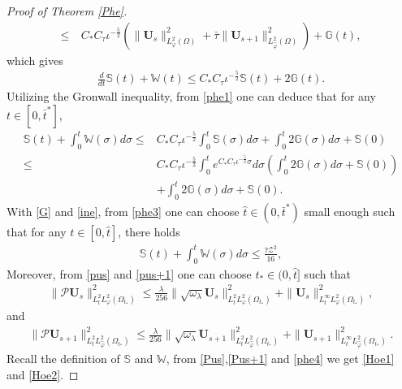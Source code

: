 \documentclass{amsart}
\numberwithin{equation}{section}
\begin{document}
\begin{proof}[Proof of Theorem \ref{Phe}]
\begin{align}
\leq&~C_{*}C_{\tau}\iota^{-\frac{5}{2}}
      \left(\|\mathbf{U}_{s}\|_{L_{\varphi}^{2}(\Omega)}^{2}+\bar{\tau}\|\mathbf{U}_{s+1}\|_{L_{\hat{\varphi}}^{2}(\Omega)}^{2}\right)
    +\mathbb{G}(t),\nonumber
\end{align}
which gives
\begin{align}\label{phe1}
\frac{d}{dt}\mathbb{S}(t)+\mathbb{W}(t)
\leq C_{*}C_{\tau}\iota^{-\frac{5}{2}}\mathbb{S}(t)+2\mathbb{G}(t).
\end{align}
Utilizing the Gronwall inequality, from \eqref{phe1} one can deduce that for any $t\in[0,\bar{t}^{*}]$,
\begin{align}\label{phe3}
\mathbb{S}(t)+\int_{0}^{t}\mathbb{W}(\sigma)d\sigma
\leq& C_{*}C_{\tau}\iota^{-\frac{5}{2}}\int_{0}^{t}\mathbb{S}(\sigma)d\sigma
     +\int_{0}^{t}2\mathbb{G}(\sigma)d\sigma
     +\mathbb{S}(0)\\
\leq& C_{*}C_{\tau}\iota^{-\frac{5}{2}}\int_{0}^{t}e^{C_{*}C_{\tau}\iota^{-\frac{5}{2}}\sigma}d\sigma
           \left(\int_{0}^{t}2\mathbb{G}(\sigma)d\sigma+\mathbb{S}(0)\right)\nonumber\\
    &+\int_{0}^{t}2\mathbb{G}(\sigma)d\sigma
     +\mathbb{S}(0).\nonumber
\end{align}
With \eqref{G} and \eqref{ine}, from \eqref{phe3} one can choose $\hat{t}\in (0,\bar{t}^{*})$ small enough such that for any $t\in[0,\hat{t}]$, there holds
\begin{align}\label{phe4}
\mathbb{S}(t)+\int_{0}^{t}\mathbb{W}(\sigma)d\sigma\leq \frac{\bar{\tau}\mathcal{Z}^{2}}{16},
\end{align}
Moreover, from \eqref{pus} and \eqref{pus+1} one can choose $t_{*}\in(0,\hat{t}]$ such that
\begin{align}\label{Pus}
\|\mathcal{P}\mathbf{U}_{s}\|_{L_{t}^{2}L_{\varphi}^{2}(\Omega_{t_{*}})}^{2}
\leq \frac{\lambda}{256}\|\sqrt{\omega_{\lambda}}\mathbf{U}_{s}\|_{L_{t}^{2}L_{\varphi}^{2}(\Omega_{t_{*}})}^{2}
    +\|\mathbf{U}_{s}\|_{L_{t}^{\infty}L_{\varphi}^{2}(\Omega_{t_{*}})}^{2},
\end{align}
and
\begin{align}\label{Pus+1}
\|\mathcal{P}\mathbf{U}_{s+1}\|_{L_{t}^{2}L_{\hat{\varphi}}^{2}(\Omega_{t_{*}})}^{2}
\leq \frac{\lambda}{256}\|\sqrt{\omega_{\lambda}}\mathbf{U}_{s+1}\|_{L_{t}^{2}L_{\hat{\varphi}}^{2}(\Omega_{t_{*}})}^{2}
    +\|\mathbf{U}_{s+1}\|_{L_{t}^{\infty}L_{\hat{\varphi}}^{2}(\Omega_{t_{*}})}^{2}.
\end{align}
Recall the definition of $\mathbb{S}$ and $\mathbb{W}$, from \eqref{Pus},\eqref{Pus+1} and \eqref{phe4} we get \eqref{Hoe1} and \eqref{Hoe2}.
\end{proof}
~~~~~~~~~~
\end{document}
